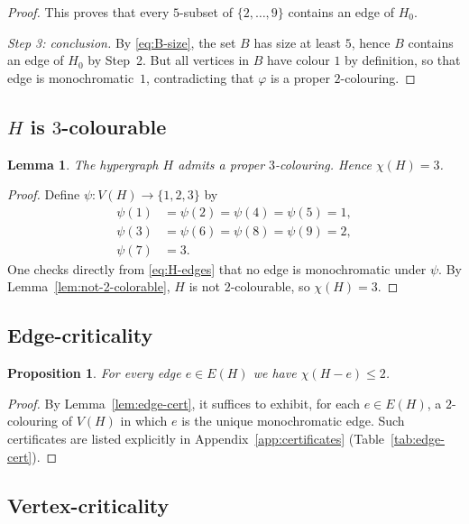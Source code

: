 \documentclass[11pt]{amsart}
\newtheorem{lemma}[theorem]{Lemma}
\newtheorem{proposition}[theorem]{Proposition}
\theoremstyle{definition}
\theoremstyle{remark}
\newcommand{\V}{V}
\newcommand{\E}{E}
\begin{document}
\begin{proof}
This proves that every $5$-subset of $\{2,\dots,9\}$ contains an edge of $H_0$.

\smallskip
\noindent\emph{Step 3: conclusion.}
By \eqref{eq:B-size}, the set $B$ has size at least $5$, hence $B$ contains an edge of $H_0$ by Step~2.
But all vertices in $B$ have colour $1$ by definition, so that edge is monochromatic~$1$, contradicting that $\varphi$ is a proper $2$-colouring.
\end{proof}

\subsection{\texorpdfstring{$H$}{H} is \texorpdfstring{$3$}{3}-colourable}

\begin{lemma}\label{lem:3-colorable}
The hypergraph $H$ admits a proper $3$-colouring.
Hence $\chi(H)=3$.
\end{lemma}

\begin{proof}
Define $\psi:\V(H)\to\{1,2,3\}$ by
\[
\begin{aligned}
\psi(1)&=\psi(2)=\psi(4)=\psi(5)=1,\\
\psi(3)&=\psi(6)=\psi(8)=\psi(9)=2,\\
\psi(7)&=3.
\end{aligned}
\]
One checks directly from \eqref{eq:H-edges} that no edge is monochromatic under $\psi$.
By Lemma~\ref{lem:not-2-colorable}, $H$ is not $2$-colourable, so $\chi(H)=3$.
\end{proof}

\subsection{Edge-criticality}

\begin{proposition}\label{prop:edge-critical}
For every edge $e\in \E(H)$ we have $\chi(H-e)\le 2$.
\end{proposition}

\begin{proof}
By Lemma~\ref{lem:edge-cert}, it suffices to exhibit, for each $e\in \E(H)$, a $2$-colouring of $\V(H)$ in which $e$ is the unique monochromatic edge.
Such certificates are listed explicitly in Appendix~\ref{app:certificates} (Table~\ref{tab:edge-cert}).
\end{proof}

\subsection{Vertex-criticality}
\end{document}
